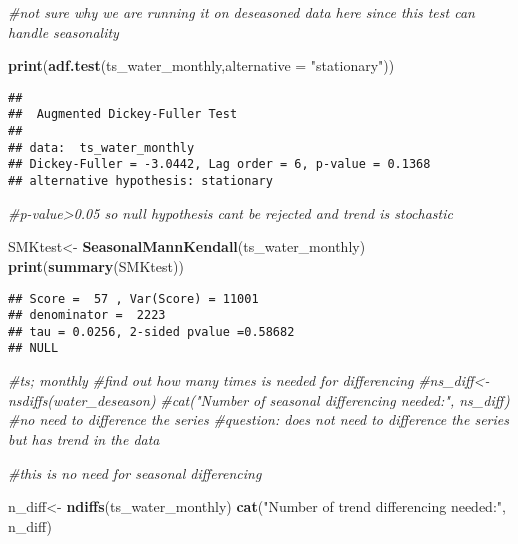 \documentclass[
]{article}
\newenvironment{Shaded}{\begin{snugshade}}{\end{snugshade}}
\newcommand{\AttributeTok}[1]{\textcolor[rgb]{0.13,0.29,0.53}{#1}}
\newcommand{\CommentTok}[1]{\textcolor[rgb]{0.56,0.35,0.01}{\textit{#1}}}
\newcommand{\FunctionTok}[1]{\textcolor[rgb]{0.13,0.29,0.53}{\textbf{#1}}}
\newcommand{\NormalTok}[1]{#1}
\newcommand{\OtherTok}[1]{\textcolor[rgb]{0.56,0.35,0.01}{#1}}
\newcommand{\StringTok}[1]{\textcolor[rgb]{0.31,0.60,0.02}{#1}}
\begin{document}
\begin{Shaded}
\begin{Highlighting}[]
\CommentTok{\#not sure why we are running it on deseasoned data here since this test can handle seasonality}

\FunctionTok{print}\NormalTok{(}\FunctionTok{adf.test}\NormalTok{(ts\_water\_monthly,}\AttributeTok{alternative =} \StringTok{"stationary"}\NormalTok{))}
\end{Highlighting}
\end{Shaded}

\begin{verbatim}
## 
##  Augmented Dickey-Fuller Test
## 
## data:  ts_water_monthly
## Dickey-Fuller = -3.0442, Lag order = 6, p-value = 0.1368
## alternative hypothesis: stationary
\end{verbatim}

\begin{Shaded}
\begin{Highlighting}[]
\CommentTok{\#p{-}value\textgreater{}0.05 so null hypothesis cant be rejected and trend is stochastic}

\NormalTok{SMKtest}\OtherTok{\textless{}{-}} \FunctionTok{SeasonalMannKendall}\NormalTok{(ts\_water\_monthly)}
\FunctionTok{print}\NormalTok{(}\FunctionTok{summary}\NormalTok{(SMKtest))}
\end{Highlighting}
\end{Shaded}

\begin{verbatim}
## Score =  57 , Var(Score) = 11001
## denominator =  2223
## tau = 0.0256, 2-sided pvalue =0.58682
## NULL
\end{verbatim}

\begin{Shaded}
\begin{Highlighting}[]
\CommentTok{\#ts; monthly}
\CommentTok{\#find out how many times is needed for differencing }
\CommentTok{\#ns\_diff\textless{}{-}nsdiffs(water\_deseason)}
\CommentTok{\#cat("Number of seasonal differencing needed:", ns\_diff) \#no need to difference the series}
\CommentTok{\#question: does not need to difference the series but has trend in the data}

\CommentTok{\#this is no need for seasonal differencing}

\NormalTok{n\_diff}\OtherTok{\textless{}{-}} \FunctionTok{ndiffs}\NormalTok{(ts\_water\_monthly)}
\FunctionTok{cat}\NormalTok{(}\StringTok{"Number of trend differencing needed:"}\NormalTok{, n\_diff)}
\end{Highlighting}
\end{Shaded}
\end{document}
